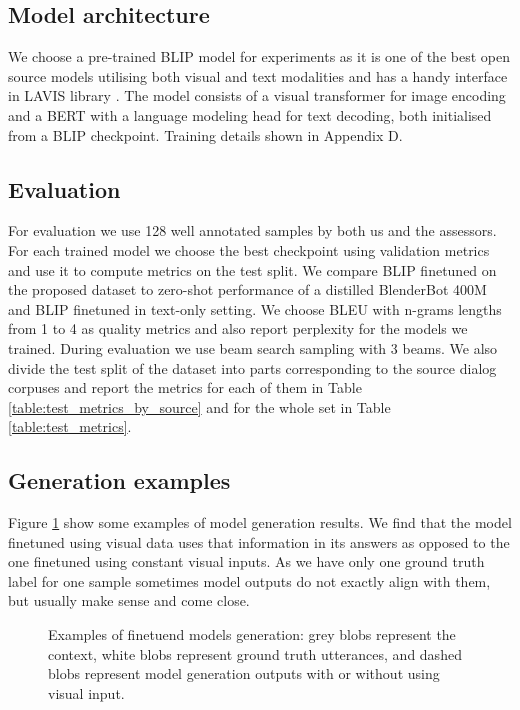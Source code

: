 \documentclass[11pt]{article}
\begin{document}
\subsection{Model architecture}

We choose a pre-trained BLIP \cite{blip} model for experiments as it is one of the best open source models utilising both visual and text modalities and has a handy interface in LAVIS library \cite{lavis}. The model consists of a visual transformer \cite{vit} for image encoding and a BERT \cite{bert} with a language modeling head for text decoding, both initialised from a BLIP checkpoint. Training details shown in Appendix D.



\subsection{Evaluation}

For evaluation we use 128 well annotated samples by both us and the assessors. For each trained model we choose the best checkpoint using validation metrics and use it to compute metrics on the test split. We compare BLIP finetuned on the proposed dataset to zero-shot performance of a distilled BlenderBot 400M \cite{blenderbot} and BLIP finetuned in text-only setting. We choose BLEU \cite{bleu} with n-grams lengths from 1 to 4 as quality metrics and also report perplexity for the models we trained. During evaluation we use beam search sampling with 3 beams. We also divide the test split of the dataset into parts corresponding to the source dialog corpuses and report the metrics for each of them in Table \ref{table:test_metrics_by_source} and for the whole set in Table \ref{table:test_metrics}.

\subsection{Generation examples}

Figure \ref{fig:examples} show some examples of model generation results. We find that the model finetuned using visual data uses that information in its answers as opposed to the one finetuned using constant visual inputs. As we have only one ground truth label for one sample sometimes model outputs do not exactly align with them, but usually make sense and come close.

\begin{figure}
    \centering
    \caption{Examples of finetuend models generation: grey blobs represent the context, white blobs represent ground truth utterances, and dashed blobs represent model generation outputs with or without using visual input.}
    \label{fig:examples}
\end{figure}
\end{document}
